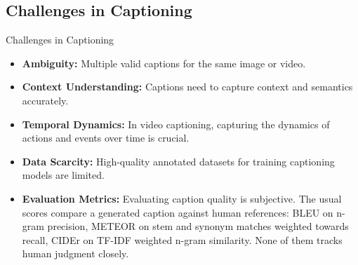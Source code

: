 \subsection{Challenges in Captioning}
\begin{frame}[allowframebreaks]{Challenges in Captioning}
    \begin{itemize}
        \item \textbf{Ambiguity:} Multiple valid captions for the same image or video.
        \item \textbf{Context Understanding:} Captions need to capture context and semantics accurately.
        \item \textbf{Temporal Dynamics:} In video captioning, capturing the dynamics of actions and events over time is crucial.
        \item \textbf{Data Scarcity:} High-quality annotated datasets for training captioning models are limited.
        \item \textbf{Evaluation Metrics:} Evaluating caption quality is subjective. The usual scores compare a generated caption against human references: BLEU on n-gram precision, METEOR on stem and synonym matches weighted towards recall, CIDEr on TF-IDF weighted n-gram similarity. None of them tracks human judgment closely.
    \end{itemize}
\end{frame}
    

